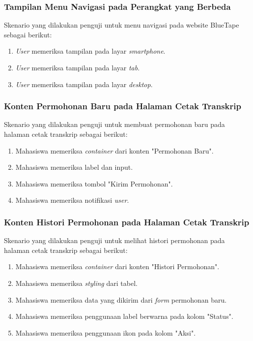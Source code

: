 \subsubsection{Tampilan Menu Navigasi pada Perangkat yang Berbeda}
Skenario yang dilakukan penguji untuk menu navigasi pada website BlueTape sebagai berikut:
\begin{enumerate}
	\item \textit{User} memeriksa tampilan pada layar \textit{smartphone}. 	
	\item \textit{User} memeriksa tampilan pada layar \textit{tab}.
	\item \textit{User} memeriksa tampilan pada layar \textit{desktop}.
\end{enumerate}

\subsubsection{Konten Permohonan Baru pada Halaman Cetak Transkrip}
Skenario yang dilakukan penguji untuk membuat permohonan baru pada halaman cetak transkrip sebagai berikut:
\begin{enumerate}
	\item Mahasiswa memeriksa \textit{container} dari konten "Permohonan Baru".
	\item Mahasiswa memeriksa label dan input.
	\item Mahasiswa memeriksa tombol "Kirim Permohonan".	
	\item Mahasiswa memeriksa notifikasi \textit{user}.
\end{enumerate}

\subsubsection{Konten Histori Permohonan pada Halaman Cetak Transkrip}
Skenario yang dilakukan penguji untuk melihat histori permohonan pada halaman cetak transkrip sebagai berikut:
\begin{enumerate}
	\item Mahasiswa memeriksa \textit{container} dari konten "Histori Permohonan".
	\item Mahasiswa memeriksa \textit{styling} dari tabel.	
	\item Mahasiswa memeriksa data yang dikirim dari \textit{form} permohonan baru.
	\item Mahasiswa memeriksa penggunaan label berwarna pada kolom "Status".		
	\item Mahasiswa memeriksa penggunaan ikon pada kolom "Aksi".	
\end{enumerate}

